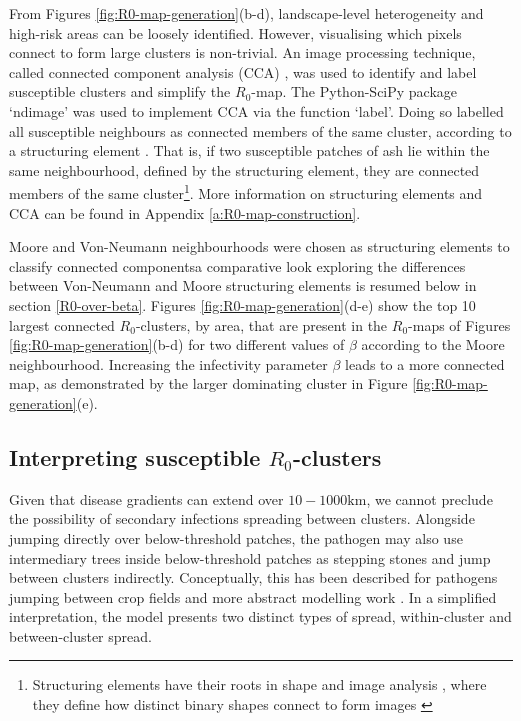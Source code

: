 From Figures \ref{fig:R0-map-generation}(b-d), landscape-level heterogeneity and high-risk areas can be loosely identified.
However, visualising which pixels connect to form large clusters is non-trivial. 
An image processing technique, called connected component analysis (CCA) \cite{CCA1, CCA2}, was used to identify and label susceptible clusters and simplify the $R_0$-map. 
The Python-SciPy package `ndimage' \cite{scipy} was used to implement CCA via the function `label'. 
Doing so labelled all susceptible neighbours as connected members of the same cluster, according to a structuring element \cite{liang1989erosion}. 
That is, if two susceptible patches of ash lie within the same neighbourhood, defined by the structuring element, they are connected members of the same cluster\footnote{Structuring elements have their roots in shape and image analysis \cite{23111}, where they define how distinct binary shapes connect to form images \cite{liang1989erosion, nachtegael2001connections}}. 
More information on structuring elements and CCA can be found in Appendix \ref{a:R0-map-construction}.%

Moore and Von-Neumann neighbourhoods were chosen as structuring elements to classify connected components\textemdash a comparative look exploring the differences between Von-Neumann and Moore 
structuring elements is resumed below in section \ref{R0-over-beta}.  
Figures \ref{fig:R0-map-generation}(d-e) show the top 10 largest connected $R_0$-clusters, by area, that are present in the $R_0$-maps of Figures \ref{fig:R0-map-generation}(b-d) for two different values of $\beta$ 
according to the Moore neighbourhood.
Increasing the infectivity parameter $\beta$ leads to a more connected map, as demonstrated by the larger dominating cluster in Figure \ref{fig:R0-map-generation}(e).

\subsection{Interpreting susceptible $R_0$-clusters}
Given that disease gradients can extend over $10-1000\mathrm{km}$, we cannot preclude the possibility of secondary infections spreading between clusters.
Alongside jumping directly over below-threshold patches, the pathogen may also use intermediary trees inside below-threshold patches as stepping stones and jump between clusters indirectly. 
Conceptually, this has been described for pathogens jumping between crop fields \cite{Gilligan-disease-management} and more abstract modelling work \cite{wingen2013long}.
In a simplified interpretation, the model presents two distinct types of spread, within-cluster and between-cluster spread. 

